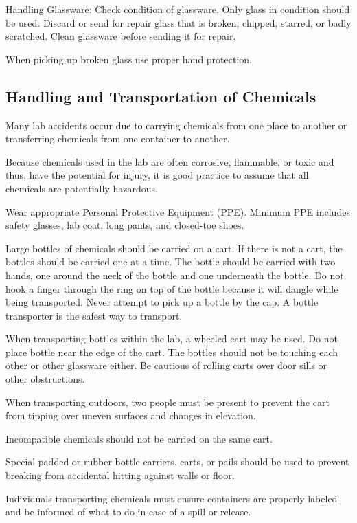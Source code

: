 \documentclass[12pt]{../SOP4_alpha}\usepackage[]{graphicx}\usepackage[]{color}
\begin{document}
\NP Handling Glassware: Check condition of glassware. Only glass in condition should be used. Discard or send for repair glass that is broken, chipped, starred, or badly scratched. Clean glassware before sending it for repair. 

\NP When picking up broken glass use proper hand protection.

\subsection*{Handling and Transportation of Chemicals}

\NP Many lab accidents occur due to carrying chemicals from one place to another or transferring chemicals from one container to another. 

\NP Because chemicals used in the lab are often corrosive, flammable, or toxic and thus, have the potential for injury, it is good practice to assume that all chemicals are potentially hazardous. 

\NP Wear appropriate Personal Protective Equipment (PPE). Minimum PPE includes safety glasses, lab coat, long pants, and closed-toe shoes.

\NP Large bottles of chemicals should be carried on a cart. If there is not a cart, the bottles should be carried one at a time. The bottle should be carried with two hands, one around the neck of the bottle and one underneath the bottle. Do not hook a finger through the ring on top of the bottle because it will dangle while being transported. Never attempt to pick up a bottle by the cap. A bottle transporter is the safest way to transport. 

\NP When transporting bottles within the lab, a wheeled cart may be used. Do not place bottle near the edge of the cart. The bottles should not be touching each other or other glassware either. Be cautious of rolling carts over door sills or other obstructions.

\NP When transporting outdoors, two people must be present to prevent the cart from tipping over uneven surfaces and changes in elevation.

\NP Incompatible chemicals should not be carried on the same cart. 

\NP Special padded or rubber bottle carriers, carts, or pails should be used to prevent breaking from accidental hitting against walls or floor. 

\NP Individuals transporting chemicals must ensure containers are properly labeled and be informed of what to do in case of a spill or release. 
\end{document}
